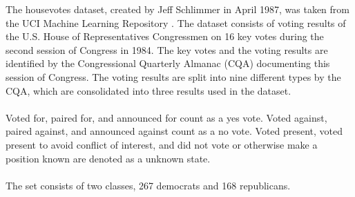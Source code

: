 The housevotes dataset, created by Jeff Schlimmer in April 1987, was taken from the UCI Machine Learning Repository \cite{Dua2019}. The dataset consists of voting results of the U.S. House of Representatives Congressmen on 16 key votes during the second session of Congress in 1984. The key votes and the voting results are identified by the Congressional Quarterly Almanac (CQA) documenting this session of Congress. The voting results are split into nine different types by the CQA, which are consolidated into three results used in the dataset.\\
\ \\
Voted for, paired for, and announced for count as a yes vote.
Voted against, paired against, and announced against count as a no vote.
Voted present, voted present to avoid conflict of interest, and did not vote or otherwise make a position known are denoted as a unknown state.\\
\ \\
The set consists of two classes, 267 democrats and 168 republicans.


